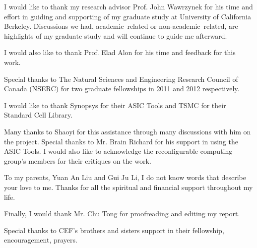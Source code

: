 \ssp

I would like to thank my research advisor Prof. John Wawrzynek for his time and effort in guiding and supporting of my graduate study at University of California Berkeley. Discussions we had, academic related or non-academic related, are highlights of my graduate study and will continue to guide me afterward. \par

\vspace{0.3cm}

I would also like to thank Prof. Elad Alon for his time and feedback for this work. \par

\vspace{0.6cm}

Special thanks to The Natural Sciences and Engineering Research Council of Canada (NSERC) for two graduate fellowships in 2011 and 2012 respectively. \par

\vspace{0.3cm}

I would like to thank Synopsys for their ASIC Tools and TSMC for their Standard Cell Library. \par

\vspace{0.3cm}

Many thanks to Shaoyi for this assistance through many discussions with him on the project. Special thanks to Mr. Brain Richard for his support in using the ASIC Tools. I would also like to acknowledge the reconfigurable computing group's members for their critiques on the work. \par

\vspace{0.6cm}

To my parents, Yuan An Liu and Gui Ju Li, I do not know words that describe your love to me. Thanks for all the spiritual and financial support throughout my life. \par

\vspace{0.3cm}

Finally, I would thank Mr. Chu Tong for proofreading and editing my report. \par

\vspace{0.1cm}

Special thanks to CEF's brothers and sisters support in their fellowship, encouragement, prayers. \par